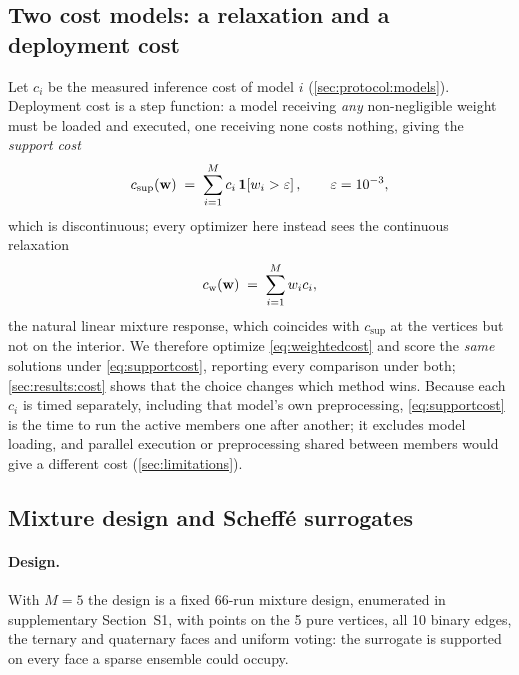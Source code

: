 \subsection{Two cost models: a relaxation and a deployment cost}
\label{sec:method:cost}

Let $c_i$ be the measured inference cost of model $i$ (\cref{sec:protocol:models}). Deployment cost is a step
function: a model receiving \emph{any} non-negligible weight must be loaded and executed, one receiving none costs
nothing, giving the \emph{support cost}
\begin{equation}
c_{\mathrm{sup}}(\mathbf{w}) \;=\; \sum_{i=1}^{M} c_i \,\mathbf{1}\!\left[w_i > \varepsilon\right], \qquad \varepsilon = 10^{-3},
\label{eq:supportcost}
\end{equation}
which is discontinuous; every optimizer here instead sees the continuous relaxation
\begin{equation}
c_{\mathrm{w}}(\mathbf{w}) \;=\; \sum_{i=1}^{M} w_i c_i ,
\label{eq:weightedcost}
\end{equation}
the natural linear mixture response, which coincides with $c_{\mathrm{sup}}$ at the vertices but not on the
interior. We therefore optimize \cref{eq:weightedcost} and score the \emph{same} solutions under
\cref{eq:supportcost}, reporting every comparison under both; \cref{sec:results:cost} shows that the choice changes
which method wins. Because each $c_i$ is timed separately, including that model's own preprocessing,
\cref{eq:supportcost} is the time to run the active members one after another; it excludes model loading, and
parallel execution or preprocessing shared between members would give a different cost (\cref{sec:limitations}).

\subsection{Mixture design and Scheff\'e surrogates}
\label{sec:method:scheffe}

\paragraph{Design.} With $M = 5$ the design is a fixed 66-run mixture design, enumerated in supplementary
Section~S1, with points on the 5 pure vertices, all 10 binary edges, the ternary and quaternary faces and uniform
voting: the surrogate is supported on every face a sparse ensemble could occupy.

